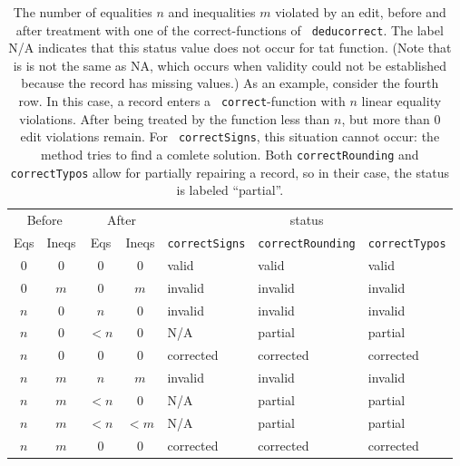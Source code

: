 \documentclass[11pt, fleqn, a4paper]{article}
\begin{document}
\begin{table}
\begin{threeparttable}
\caption{The number of equalities $n$ and inequalities $m$ violated by an edit,
before and after treatment with one of the correct-functions of {\tt
deducorrect}. The label  {\sf N/A} indicates that this status value does not
occur for tat function. (Note that is is not the same as {\sf NA}, which occurs
when validity could not be established because the record has missing values.)
As an example, consider the fourth row.  In this case, a record enters a {\tt
correct}-function with $n$ linear equality violations. After being treated by
the function less than $n$, but more than 0 edit violations remain.  For {\tt
correctSigns}, this situation cannot occur: the method tries to find a comlete
solution. Both {\tt correctRounding} and {\tt correctTypos} allow for partially
repairing a record, so in their case, the status is labeled ``partial''.}
\label{statusvalues}
\begin{tabular}{cccclll}
\hline
\multicolumn{2}{c}{Before}&\multicolumn{2}{c}{After}&\multicolumn{3}{c}{status}\\
Eqs&  Ineqs &  Eqs  &Ineqs   &{\tt correctSigns}   & {\tt correctRounding} &{\tt correctTypos}\\
\hline
$0$  &  $0$     &  $0$    &$0$      &{\sf valid  }        &{\sf  valid     }      &{\sf  valid}\\
$0$  &  $m$     &  $0$    &$m$      &{\sf invalid}        &{\sf  invalid   }      &{\sf  invalid}\\
$n$  &  $0$     &  $n$    &$0$      &{\sf invalid}        &{\sf  invalid   }      &{\sf  invalid}\\
$n$  &  $0$     &  $<n$   &$0$      &{\sf N/A   }         &{\sf  partial   }      &{\sf  partial}\\
$n$  &  $0$     &  $0$    &$0$      &{\sf corrected}      &{\sf  corrected }      &{\sf  corrected}\\
$n$  &  $m$     &  $n$    &$m$      &{\sf invalid}        &{\sf  invalid   }      &{\sf  invalid}\\
$n$  &  $m$     &  $<n$   &$0$      &{\sf N/A     }       &{\sf  partial   }      &{\sf  partial}\\
$n$  &  $m$     &  $<n$   &$<m$     &{\sf N/A      }      &{\sf  partial   }      &{\sf  partial}\\
$n$  &  $m$     &  $0$    &$0$      &{\sf corrected}      &{\sf corrected  }      &{\sf corrected}\\
\hline
\end{tabular}
\end{threeparttable}
\end{table}
%
\end{document}
